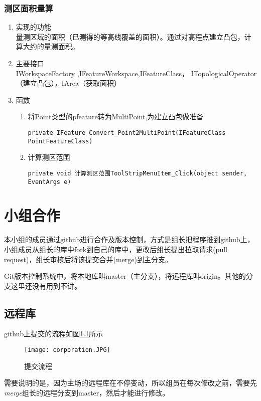 \documentclass[twoside,color=blue,mathpazo,titlestyle=hang,12pt]{elegantbook}
\numberwithin{equation}{section}
\begin{document}
\subsection{测区面积量算}
\begin{enumerate}
\item 实现的功能\\
量测区域的面积（已测得的等高线覆盖的面积）。通过对高程点建立凸包，计算大约的量测面积。
\item 主要接口\\IWorkspaceFactory ,IFeatureWorkspace,IFeatureClass，
ITopologicalOperator（建立凸包），IArea（获取面积）
\item 函数
\begin{enumerate}
\item 将Point类型的pfeature转为MultiPoint,为建立凸包做准备
\begin{lstlisting}
private IFeature Convert_Point2MultiPoint(IFeatureClass PointFeatureClass)
\end{lstlisting}
\item 计算测区范围
\begin{lstlisting}
private void 计算测区范围ToolStripMenuItem_Click(object sender, EventArgs e)
\end{lstlisting}
\end{enumerate}
\end{enumerate}



\chapter{小组合作}

本小组的成员通过github进行合作及版本控制，方式是组长把程序推到github上，小组成员从组长的库中fork到自己的库中，更改后组长提出拉取请求(pull request)，组长审核后将该提交合并(merge)到主分支。

Git版本控制系统中，将本地库叫master（主分支），将远程库叫origin。其他的分支这里还没有用到不讲。

\section{远程库}

github上提交的流程如图\ref{fig:cor}所示
\begin{figure}[htbp]
\caption{提交流程}
\label{fig:cor}
\centering
\texttt{[image: corporation.JPG]}
\end{figure}

需要说明的是，因为主场的远程库在不停变动，所以组员在每次修改之前，需要先\emph{merge}组长的远程分支到master，然后才能进行修改。
\end{document}
